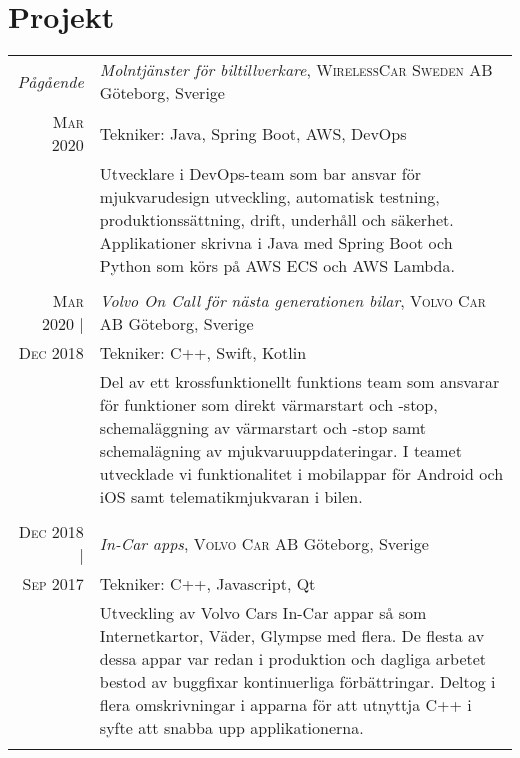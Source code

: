 \documentclass[a4paper,10pt]{scrartcl} %
\begin{document}
\section{Projekt}
\begin{tabular}{r|p{15cm}}


\emph{Pågående} 	                & \emph{Molntjänster för biltillverkare}, \textsc{WirelessCar Sweden AB} \hfill Göteborg, Sverige \\
\textsc{Mar 2020}                   & \footnotesize{Tekniker: Java, Spring Boot, AWS, DevOps} \\
\phantom{abcdefghijklm}             & \footnotesize{Utvecklare i DevOps-team som bar ansvar för mjukvarudesign utveckling, automatisk testning, produktionssättning, drift, underhåll och säkerhet. Applikationer skrivna i Java med Spring Boot och Python som körs på AWS ECS och AWS Lambda.}\\
\multicolumn{2}{c}{} \\


\textsc{Mar 2020} |                 & \emph{Volvo On Call för nästa generationen bilar}, \textsc{Volvo Car AB} \hfill Göteborg, Sverige \\
\textsc{Dec 2018}                   & \footnotesize{Tekniker: C++, Swift, Kotlin} \\
\phantom{abcdefghijklm}             & \footnotesize{Del av ett krossfunktionellt funktions team som ansvarar för funktioner som direkt värmarstart och -stop, schemaläggning av värmarstart och -stop samt schemalägning av mjukvaruuppdateringar. I teamet utvecklade vi funktionalitet i mobilappar för Android och iOS samt telematikmjukvaran i bilen. }\\
\multicolumn{2}{c}{} \\


\textsc{Dec 2018} | 	            & \emph{In-Car apps}, \textsc{Volvo Car AB} \hfill Göteborg, Sverige \\
\textsc{Sep 2017}                   & \footnotesize{Tekniker: C++, Javascript, Qt} \\
\phantom{abcdefghijklm}             & \footnotesize{Utveckling av Volvo Cars In-Car appar så som Internetkartor, Väder, Glympse med flera. De flesta av dessa appar var redan i produktion och dagliga arbetet bestod av buggfixar kontinuerliga förbättringar. Deltog i flera omskrivningar i apparna för att utnyttja C++ i syfte att snabba upp applikationerna.}\\
\multicolumn{2}{c}{} \\


\end{tabular}
\end{document}
